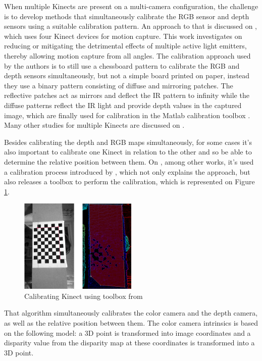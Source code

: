 \documentclass[msc, a4paper, classic, en]{ufbathesis}
\begin{document}
When multiple Kinects are present on a multi-camera configuration, the challenge is to develop methods that simultaneously calibrate the RGB sensor and depth sensors using a suitable calibration pattern. An approach to that is discussed on \cite{berger2011markerless}, which uses four Kinect devices for motion capture. This work investigates on reducing or mitigating the detrimental effects of multiple active light emitters, thereby allowing motion capture from all angles. The calibration approach used by the authors is to still use a chessboard pattern to calibrate the RGB and depth sensors simultaneously, but not a simple board printed on paper, instead they use a binary pattern consisting of diffuse and mirroring patches. The reflective patches act as mirrors and deflect the IR pattern to infinity while the diffuse patterns reflect the IR light and provide depth values in the captured image, which are finally used for calibration in the Matlab calibration toolbox \cite{matlab}. Many other studies for multiple Kinects are discussed on \cite{schroder2011multiple}.

Besides calibrating the depth and RGB maps simultaneously, for some cases it's also important to calibrate one Kinect in relation to the other and so be able to determine the relative position between them. On \cite{magnus2013}, among other works, it's used a calibration process introduced by \cite{herrera}, which not only explains the approach, but also releases a toolbox to perform the calibration, which is represented on Figure \ref{fig:herrera}.

\begin{figure}
\centering
\includegraphics[width=0.5\textwidth]{images/herrera.png}
\caption{Calibrating Kinect using toolbox from \cite{herrera}}
\label{fig:herrera}
\end{figure}

That algorithm simultaneously calibrates the color camera and the depth camera, as well as the relative position between them. The color camera intrinsics is based on the following model: a 3D point is transformed into image coordinates and a disparity value from the disparity map at these coordinates is transformed into a 3D point.
\end{document}
